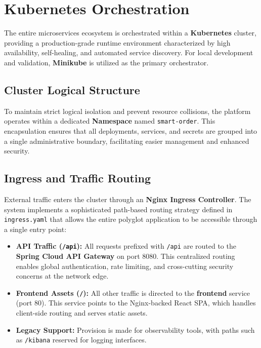 \documentclass[12pt,a4paper]{report}
\begin{document}
\chapter{Kubernetes Orchestration}
The entire microservices ecosystem is orchestrated within a \textbf{Kubernetes} cluster, providing a production-grade runtime environment characterized by high availability, self-healing, and automated service discovery. For local development and validation, \textbf{Minikube} is utilized as the primary orchestrator.

\section{Cluster Logical Structure}
To maintain strict logical isolation and prevent resource collisions, the platform operates within a dedicated \textbf{Namespace} named \texttt{smart-order}. This encapsulation ensures that all deployments, services, and secrets are grouped into a single administrative boundary, facilitating easier management and enhanced security.

\section{Ingress and Traffic Routing}
External traffic enters the cluster through an \textbf{Nginx Ingress Controller}. The system implements a sophisticated path-based routing strategy defined in \texttt{ingress.yaml} that allows the entire polyglot application to be accessible through a single entry point:
\begin{itemize}
    \item \textbf{API Traffic (\texttt{/api}):} All requests prefixed with \texttt{/api} are routed to the \textbf{Spring Cloud API Gateway} on port 8080. This centralized routing enables global authentication, rate limiting, and cross-cutting security concerns at the network edge.
    \item \textbf{Frontend Assets (\texttt{/}):} All other traffic is directed to the \textbf{frontend} service (port 80). This service points to the Nginx-backed React SPA, which handles client-side routing and serves static assets.
    \item \textbf{Legacy Support:} Provision is made for observability tools, with paths such as \texttt{/kibana} reserved for logging interfaces.
\end{itemize}
\end{document}
